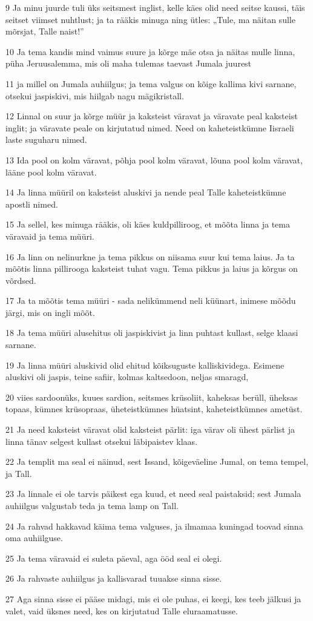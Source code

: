 \par 9 Ja minu juurde tuli üks seitsmest inglist, kelle käes olid need seitse kaussi, täis seitset viimset nuhtlust; ja ta rääkis minuga ning ütles: „Tule, ma näitan sulle mõrsjat, Talle naist!”
\par 10 Ja tema kandis mind vaimus suure ja kõrge mäe otsa ja näitas mulle linna, püha Jeruusalemma, mis oli maha tulemas taevast Jumala juurest
\par 11 ja millel on Jumala auhiilgus; ja tema valgus on kõige kallima kivi sarnane, otsekui jaspiskivi, mis hiilgab nagu mägikristall.
\par 12 Linnal on suur ja kõrge müür ja kaksteist väravat ja väravate peal kaksteist inglit; ja väravate peale on kirjutatud nimed. Need on kaheteistkümne Iisraeli laste suguharu nimed.
\par 13 Ida pool on kolm väravat, põhja pool kolm väravat, lõuna pool kolm väravat, lääne pool kolm väravat.
\par 14 Ja linna müüril on kaksteist aluskivi ja nende peal Talle kaheteistkümne apostli nimed.
\par 15 Ja sellel, kes minuga rääkis, oli käes kuldpilliroog, et mõõta linna ja tema väravaid ja tema müüri.
\par 16 Ja linn on nelinurkne ja tema pikkus on niisama suur kui tema laius. Ja ta mõõtis linna pillirooga kaksteist tuhat vagu. Tema pikkus ja laius ja kõrgus on võrdsed.
\par 17 Ja ta mõõtis tema müüri - sada nelikümmend neli küünart, inimese mõõdu järgi, mis on ingli mõõt.
\par 18 Ja tema müüri alusehitus oli jaspiskivist ja linn puhtast kullast, selge klaasi sarnane.
\par 19 Ja linna müüri aluskivid olid ehitud kõiksuguste kalliskividega. Esimene aluskivi oli jaspis, teine safiir, kolmas kaltsedoon, neljas smaragd,
\par 20 viies sardoonüks, kuues sardion, seitsmes krüsoliit, kaheksas berüll, üheksas topaas, kümnes krüsopraas, üheteistkümnes hüatsint, kaheteistkümnes ametüst.
\par 21 Ja need kaksteist väravat olid kaksteist pärlit: iga värav oli ühest pärlist ja linna tänav selgest kullast otsekui läbipaistev klaas.
\par 22 Ja templit ma seal ei näinud, sest Issand, kõigeväeline Jumal, on tema tempel, ja Tall.
\par 23 Ja linnale ei ole tarvis päikest ega kuud, et need seal paistaksid; sest Jumala auhiilgus valgustab teda ja tema lamp on Tall.
\par 24 Ja rahvad hakkavad käima tema valguses, ja ilmamaa kuningad toovad sinna oma auhiilguse.
\par 25 Ja tema väravaid ei suleta päeval, aga ööd seal ei olegi.
\par 26 Ja rahvaste auhiilgus ja kallisvarad tuuakse sinna sisse.
\par 27 Aga sinna sisse ei pääse midagi, mis ei ole puhas, ei keegi, kes teeb jälkusi ja valet, vaid üksnes need, kes on kirjutatud Talle eluraamatusse.


